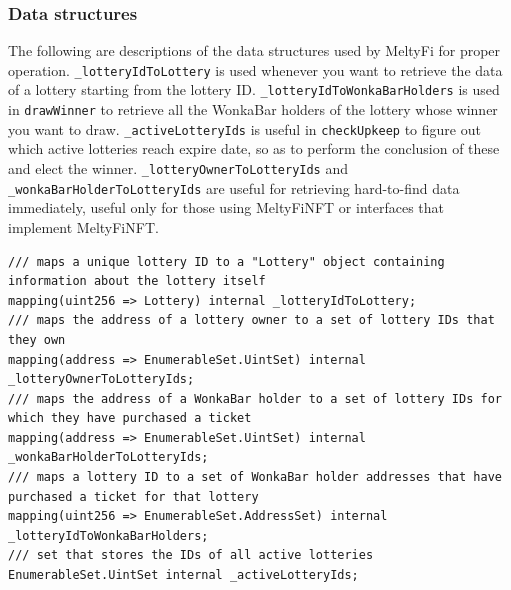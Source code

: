 \subsubsection{Data structures}
The following are descriptions of the data structures used by MeltyFi for proper operation. \texttt{\_lotteryIdToLottery} is used whenever you want to retrieve the data of a lottery starting from the lottery ID. \texttt{\_lotteryIdToWonkaBarHolders} is used in \texttt{drawWinner} to retrieve all the WonkaBar holders of the lottery whose winner you want to draw. \texttt{\_activeLotteryIds} is useful in \texttt{checkUpkeep} to figure out which active lotteries reach expire date, so as to perform the conclusion of these and elect the winner. \texttt{\_lotteryOwnerToLotteryIds} and \texttt{\_wonkaBarHolderToLotteryIds} are useful for retrieving hard-to-find data immediately, useful only for those using MeltyFiNFT or interfaces that implement MeltyFiNFT.
\begin{verbatim}
/// maps a unique lottery ID to a "Lottery" object containing information about the lottery itself
mapping(uint256 => Lottery) internal _lotteryIdToLottery;
/// maps the address of a lottery owner to a set of lottery IDs that they own
mapping(address => EnumerableSet.UintSet) internal _lotteryOwnerToLotteryIds;
/// maps the address of a WonkaBar holder to a set of lottery IDs for which they have purchased a ticket
mapping(address => EnumerableSet.UintSet) internal _wonkaBarHolderToLotteryIds;
/// maps a lottery ID to a set of WonkaBar holder addresses that have purchased a ticket for that lottery
mapping(uint256 => EnumerableSet.AddressSet) internal _lotteryIdToWonkaBarHolders;
/// set that stores the IDs of all active lotteries
EnumerableSet.UintSet internal _activeLotteryIds;
\end{verbatim}

